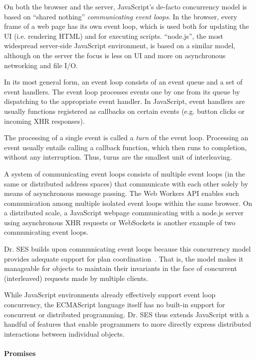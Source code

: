 \documentclass{llncs}
\begin{document}
On both the browser and the server, JavaScript's de-facto concurrency model is based on ``shared nothing'' \emph{communicating event loops}. In the browser, every frame of a web page has its own event loop, which is used both for updating the UI (i.e. rendering HTML) and for executing scripts. ``node.js'', the most widespread server-side JavaScript environment, is based on a similar model, although on the server the focus is less on UI and more on asynchronous networking and file I/O.

In its most general form, an event loop consists of an event queue and a set of event handlers. The event loop processes events one by one from its queue by dispatching to the appropriate event handler. In JavaScript, event handlers are usually functions registered as callbacks on certain events (e.g. button clicks or incoming XHR responses).

The processing of a single event is called a \emph{turn} of the event loop. Processing an event usually entails calling a callback function, which then runs to completion, without any interruption. Thus, turns are the smallest unit of interleaving.

A system of communicating event loops consists of multiple event loops (in the same or distributed address spaces) that communicate with each other solely by means of asynchronous message passing. The Web Workers API enables such communication among multiple isolated event loops within the same browser. On a distributed scale, a JavaScript webpage communicating with a node.js server using asynchronous XHR requests or WebSockets is another example of two communicating event loops.

Dr. SES builds upon communicating event loops because this concurrency model provides adequate support for plan coordination~\cite{miller:strangers}. That is, the model makes it manageable for objects to maintain their invariants in the face of concurrent (interleaved) requests made by multiple clients.

While JavaScript environments already effectively support event loop concurrency, the ECMAScript language itself has no built-in support for concurrent or distributed programming. Dr. SES thus extends JavaScript with a handful of features that enable programmers to more directly express distributed interactions between individual objects.

\paragraph{Promises}
\end{document}
